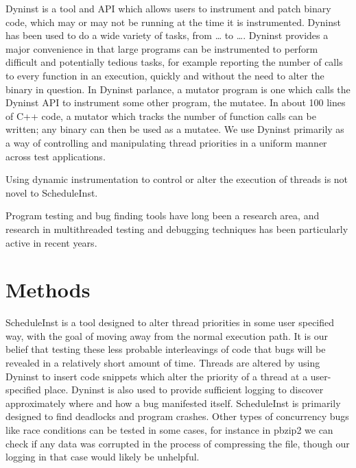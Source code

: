 \documentclass[10pt,]{article} %
\begin{document}


Dyninst is a tool and API which allows users to instrument and patch binary code, which may or may not be running at the time it is instrumented.  Dyninst has been used to do a wide variety of tasks, from … to ….  Dyninst provides a major convenience in that large programs can be instrumented to perform difficult and potentially tedious tasks, for example reporting the number of calls to every function in an execution, quickly and without the need to alter the binary in question.  In Dyninst parlance, a mutator program is one which calls the Dyninst API to instrument some other program, the mutatee.   In about 100 lines of C++ code, a mutator which tracks the number of function calls can be written; any binary can then be used as a mutatee.  We use Dyninst primarily as a way of controlling and manipulating thread priorities in a uniform manner across test applications.  


Using dynamic instrumentation to control or alter the execution of threads is not novel to ScheduleInst.  



Program testing and bug finding tools have long been a research area, and research in multithreaded testing and debugging techniques has been particularly active in recent years.  


\section{Methods}

	ScheduleInst is a tool designed to alter thread priorities in some user specified way, with the goal of moving away from the normal execution path.  It is our belief that testing these less probable interleavings of code that bugs will be revealed in a relatively short amount of time.  Threads are altered by using Dyninst to insert code snippets which alter the priority of a thread at a user-specified place. Dyninst is also used to provide sufficient logging to discover approximately where and how a bug manifested itself. ScheduleInst is primarily designed to find deadlocks and program crashes.  Other types of concurrency bugs like race conditions can be tested in some cases, for instance in pbzip2 we can check if any data was corrupted in the process of compressing the file, though our logging in that case would likely be unhelpful.  
\end{document}
